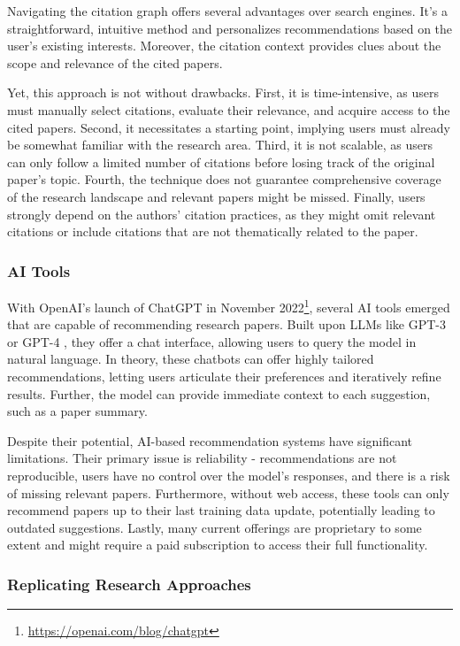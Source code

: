 Navigating the citation graph offers several advantages over search engines. It's a straightforward, intuitive method and personalizes recommendations based on the user's existing interests. Moreover, the citation context provides clues about the scope and relevance of the cited papers.

Yet, this approach is not without drawbacks.
First, it is time-intensive, as users must manually select citations, evaluate their relevance, and acquire access to the cited papers.
Second, it necessitates a starting point, implying users must already be somewhat familiar with the research area.
Third, it is not scalable, as users can only follow a limited number of citations before losing track of the original paper's topic.
Fourth, the technique does not guarantee comprehensive coverage of the research landscape and relevant papers might be missed.
Finally, users strongly depend on the authors' citation practices, as they might omit relevant citations or include citations that are not thematically related to the paper.


\subsubsection*{AI Tools}

With OpenAI's launch of ChatGPT in November 2022\footnote{\url{https://openai.com/blog/chatgpt}}, several AI tools emerged that are capable of recommending research papers. Built upon \ac{LLMs} like GPT-3 \cite{BrownLanguageModels2020} or GPT-4 \cite{OpenAIGPT4Technical2023}, they offer a chat interface, allowing users to query the model in natural language.
In theory, these chatbots can offer highly tailored recommendations, letting users articulate their preferences and iteratively refine results.
Further, the model can provide immediate context to each suggestion, such as a paper summary.

Despite their potential, AI-based recommendation systems have significant limitations.
Their primary issue is reliability - recommendations are not reproducible, users have no control over the model's responses, and there is a risk of missing relevant papers.
Furthermore, without web access, these tools can only recommend papers up to their last training data update, potentially leading to outdated suggestions. Lastly, many current offerings are proprietary to some extent and might require a paid subscription to access their full functionality.


\subsubsection*{Replicating Research Approaches}

